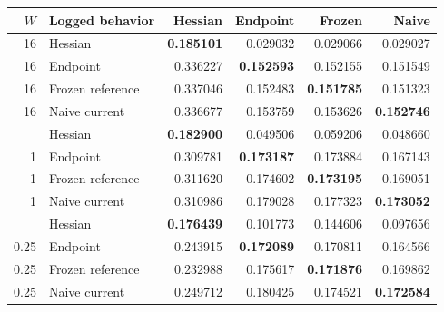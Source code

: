 \begin{tabular}{@{}rlrrrr@{}}
\toprule
$W$ & Logged behavior & Hessian & Endpoint & Frozen & Naive \\
\midrule
16 & Hessian & \textbf{0.185101} & 0.029032 & 0.029066 & 0.029027 \\
16 & Endpoint & 0.336227 & \textbf{0.152593} & 0.152155 & 0.151549 \\
16 & Frozen reference & 0.337046 & 0.152483 & \textbf{0.151785} & 0.151323 \\
16 & Naive current & 0.336677 & 0.153759 & 0.153626 & \textbf{0.152746} \\
\addlinespace
1 & Hessian & \textbf{0.182900} & 0.049506 & 0.059206 & 0.048660 \\
1 & Endpoint & 0.309781 & \textbf{0.173187} & 0.173884 & 0.167143 \\
1 & Frozen reference & 0.311620 & 0.174602 & \textbf{0.173195} & 0.169051 \\
1 & Naive current & 0.310986 & 0.179028 & 0.177323 & \textbf{0.173052} \\
\addlinespace
0.25 & Hessian & \textbf{0.176439} & 0.101773 & 0.144606 & 0.097656 \\
0.25 & Endpoint & 0.243915 & \textbf{0.172089} & 0.170811 & 0.164566 \\
0.25 & Frozen reference & 0.232988 & 0.175617 & \textbf{0.171876} & 0.169862 \\
0.25 & Naive current & 0.249712 & 0.180425 & 0.174521 & \textbf{0.172584} \\
\bottomrule
\end{tabular}
